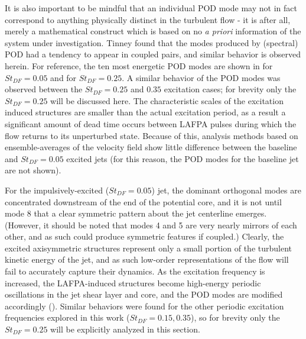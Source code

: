 It is also important to be mindful that an individual POD mode may not in fact correspond to anything physically distinct in the turbulent flow - it is after all, merely a mathematical construct which is based on no \textit{a priori} information of the system under investigation.
Tinney \etal \citep{Tinney2008b} found that the modes produced by (spectral) POD had a tendency to appear in coupled pairs, and similar behavior is observed herein. 
For reference, the ten most energetic POD modes are shown in  for $St_{DF} = 0.05$ and  for $St_{DF} = 0.25$.
A similar behavior of the POD modes was observed between the $St_{DF} = 0.25$ and $0.35$ excitation cases; for brevity only the $St_{DF} = 0.25$ will be discussed here.
The characteristic scales of the excitation induced structures are smaller than the actual excitation period, as a result a significant amount of dead time occurs between LAFPA pulses during which the flow returns to its unperturbed state.
Because of this, analysis methods based on ensemble-averages of the velocity field show little difference between the baseline and $St_{DF} = 0.05$ excited jets (for this reason, the POD modes for the baseline jet are not shown).

For the impulsively-excited ($St_{DF} = 0.05$) jet, the dominant orthogonal modes are concentrated downstream of the end of the potential core, and it is not until mode 8 that a clear symmetric pattern about the jet centerline emerges. 
(However, it should be noted that modes 4 and 5 are very nearly mirrors of each other, and as such could produce symmetric features if coupled.)
Clearly, the excited axisymmetric structures represent only a small portion of the turbulent kinetic energy of the jet, and as such low-order representations of the flow will fail to accurately capture their dynamics.
As the excitation frequency is increased, the LAFPA-induced structures become high-energy periodic oscillations in the jet shear layer and core, and the POD modes are modified accordingly ().
Similar behaviors were found for the other periodic excitation frequencies explored in this work ($St_{DF} = 0.15, 0.35$), so for brevity only the $St_{DF} = 0.25$ will be explicitly analyzed in this section.

